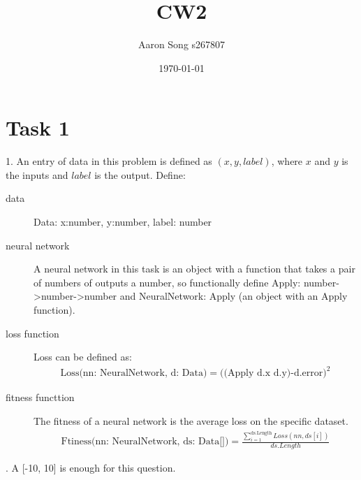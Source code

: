 \documentclass[12pt]{article}
\author{Aaron Song s267807}
\title{CW2}
\date{\today}
\begin{document}
\maketitle



\section{Task 1}

1. An entry of data in this problem is defined as $(x,y,label)$, where $x$ and $y$ is the inputs and $label$ is the output. Define:
\begin{description}
    \item[data] Data: x:number, y:number, label: number
    \item[neural network] A neural network in this task is an object with a function that takes a pair of numbers of outputs a number, so functionally define Apply: number->number->number and NeuralNetwork: { Apply } (an object with an Apply function).
    \item[loss function] Loss can be defined as:
    \begin{gather*}
    \textrm{Loss(nn: NeuralNetwork, d: Data)} = ((\textrm{Apply d.x d.y)-d.error)}^2
    \end{gather*}
    \item[fitness functtion] The fitness of a neural network is the average loss on the specific dataset. 
    \begin{gather*}
    \textrm{Ftiness(nn: NeuralNetwork, ds: Data[])} = \frac{\sum_{i=1}^{\textrm{ds.Length}}Loss(nn, ds[i])}{ds.Length}
    \end{gather*}
\end{description}

. A [-10, 10] is enough for this question.
\end{document}
